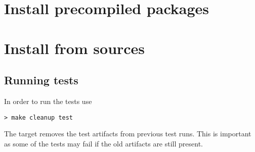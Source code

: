 

\section{Install precompiled packages}

\section{Install from sources}

\subsection{Running tests}

In order to run the tests use 
\begin{verbatim}
> make cleanup test
\end{verbatim}
The  target removes the test artifacts from previous test runs.
This is important as some of the tests may fail if the old artifacts are still
present.
